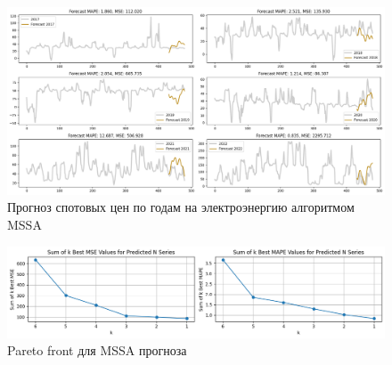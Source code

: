 \documentclass{article}
\begin{document}
\begin{figure}[H]
	\centering
	\includegraphics[width=1\textwidth]{figures/mssa_elspot_6plots.png}
	\caption{Прогноз спотовых цен по годам на электроэнергию алгоритмом MSSA}
	\label{fig:fig3}
\end{figure}

\begin{figure}[H]
	\centering
	\includegraphics[width=1\textwidth]{figures/optimal_front.png}
	\caption{Pareto front для MSSA прогноза}
	\label{fig:fig3}
\end{figure}


\end{document}
